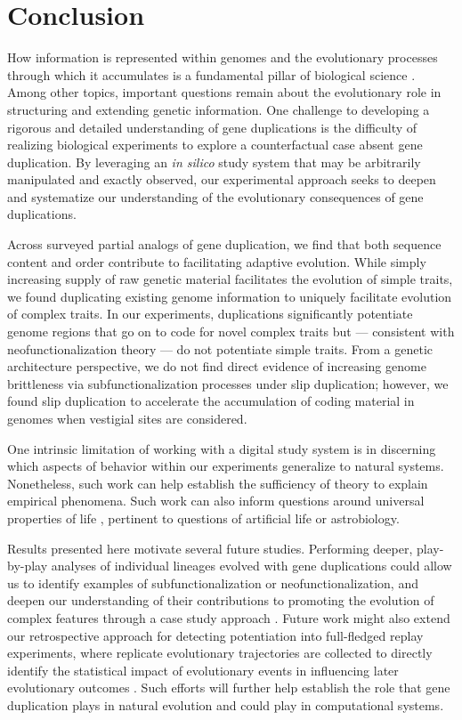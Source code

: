 \section{Conclusion} \label{sec:conclusion}

How information is represented within genomes and the evolutionary processes through which it accumulates is a fundamental pillar of biological science \citep{adami2024evolution}.
Among other topics, important questions remain about the evolutionary role in structuring and extending genetic information.
One challenge to developing a rigorous and detailed understanding of gene duplications is the difficulty of realizing biological experiments to explore a counterfactual case absent gene duplication.
By leveraging an \textit{in silico} study system that may be arbitrarily manipulated and exactly observed, our experimental approach seeks to deepen and systematize our understanding of the evolutionary consequences of gene duplications.

Across surveyed partial analogs of gene duplication, we find that both sequence content and order contribute to facilitating adaptive evolution.
While simply increasing supply of raw genetic material facilitates the evolution of simple traits, we found duplicating existing genome information to uniquely facilitate evolution of complex traits.
In our experiments, duplications significantly potentiate genome regions that go on to code for novel complex traits but --- consistent with neofunctionalization theory --- do not potentiate simple traits.
From a genetic architecture perspective, we do not find direct evidence of increasing genome brittleness via subfunctionalization processes under slip duplication; however, we found slip duplication to accelerate the accumulation of coding material in genomes when vestigial sites are considered.

One intrinsic limitation of working with a digital study system is in discerning which aspects of behavior within our experiments generalize to natural systems.
Nonetheless, such work can help establish the sufficiency of theory to explain empirical phenomena.
Such work can also inform questions around universal properties of life \citep{dorin2024what}, pertinent to questions of artificial life or astrobiology.

Results presented here motivate several future studies.
Performing deeper, play-by-play analyses of individual lineages evolved with gene duplications could allow us to identify examples of subfunctionalization or neofunctionalization, and deepen our understanding of  their contributions to promoting the evolution of complex features through a case study approach \citep{mcphee2018detailed}.
Future work might also extend our retrospective approach for detecting potentiation into full-fledged replay experiments, where replicate evolutionary trajectories are collected to directly identify the statistical impact of evolutionary events in influencing later evolutionary outcomes \citep{blount2018contingency,Ferguson2023}.
Such efforts will further help establish the role that gene duplication plays in natural evolution and could play in computational systems.

